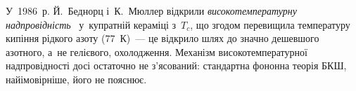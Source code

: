 


У~1986~р. Й.~Беднорц і~К.~Мюллер відкрили \emph{високотемпературну надпровідність}~\cite{Bednorz1986}
у~купратній кераміці з~$T_c$, що згодом перевищила температуру кипіння рідкого азоту
($77$~К)~--- це відкрило шлях до значно дешевшого азотного, а~не гелієвого, охолодження.
Механізм високотемпературної надпровідності досі остаточно не з'ясований: стандартна
фононна теорія БКШ, найімовірніше, його не пояснює.

